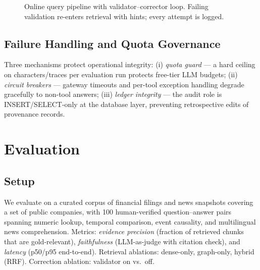 \documentclass[conference]{IEEEtran}
\begin{document}
\begin{figure}[t]
\centering
{}
\caption{Online query pipeline with validator--corrector loop. Failing validation re-enters retrieval with hints; every attempt is logged.}
\label{fig:query}
\end{figure}

\subsection{Failure Handling and Quota Governance}
Three mechanisms protect operational integrity: (i) \emph{quota guard} --- a hard ceiling on characters/traces per evaluation run protects free-tier LLM budgets; (ii) \emph{circuit breakers} --- gateway timeouts and per-tool exception handling degrade gracefully to non-tool answers; (iii) \emph{ledger integrity} --- the audit role is INSERT/SELECT-only at the database layer, preventing retrospective edits of provenance records.

\section{Evaluation}\label{sec:eval}

\subsection{Setup}
We evaluate on a curated corpus of financial filings and news snapshots covering a set of public companies, with 100 human-verified question--answer pairs spanning numeric lookup, temporal comparison, event causality, and multilingual news comprehension. Metrics: \emph{evidence precision} (fraction of retrieved chunks that are gold-relevant), \emph{faithfulness} (LLM-as-judge \cite{zheng2023judge} with citation check), and \emph{latency} (p50/p95 end-to-end). Retrieval ablations: dense-only, graph-only, hybrid (RRF). Correction ablation: validator on vs.\ off.
\end{document}

